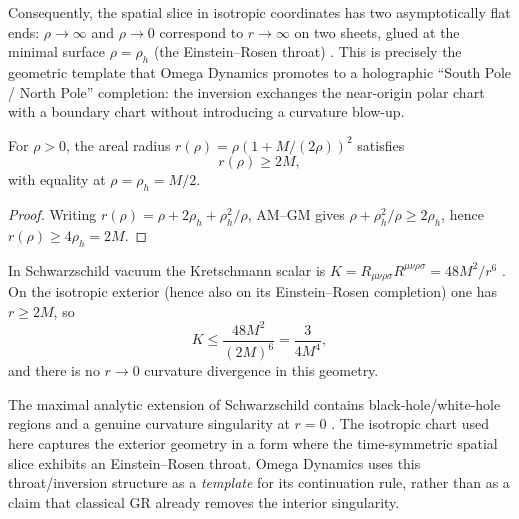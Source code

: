 Consequently, the spatial slice in isotropic coordinates has two asymptotically flat ends: $\rho\to\infty$ and $\rho\to 0$ correspond to $r\to\infty$ on two sheets, glued at the minimal surface $\rho=\rho_h$ (the Einstein--Rosen throat) \cite{EinsteinRosen1935, Kruskal1960}. This is precisely the geometric template that Omega Dynamics promotes to a holographic ``South Pole / North Pole'' completion: the inversion exchanges the near-origin polar chart with a boundary chart without introducing a curvature blow-up.

\begin{proposition}
For $\rho>0$, the areal radius $r(\rho)=\rho(1+M/(2\rho))^2$ satisfies
\begin{equation}
  r(\rho)\ge 2M,
\end{equation}
with equality at $\rho=\rho_h=M/2$.
\end{proposition}
\begin{proof}
Writing $r(\rho)=\rho+2\rho_h+\rho_h^2/\rho$, AM--GM gives $\rho+\rho_h^2/\rho\ge 2\rho_h$, hence $r(\rho)\ge 4\rho_h=2M$.
\end{proof}

\begin{corollary}
In Schwarzschild vacuum the Kretschmann scalar is $K=R_{\mu\nu\rho\sigma}R^{\mu\nu\rho\sigma}=48 M^2/r^6$ \cite{MisnerThorneWheeler1973}. On the isotropic exterior (hence also on its Einstein--Rosen completion) one has $r\ge 2M$, so
\begin{equation}
  K \le \frac{48M^2}{(2M)^6}=\frac{3}{4M^4},
\end{equation}
and there is no $r\to 0$ curvature divergence in this geometry.
\end{corollary}

\begin{remark}
The maximal analytic extension of Schwarzschild contains black-hole/white-hole regions and a genuine curvature singularity at $r=0$ \cite{Kruskal1960, Wald1984}. The isotropic chart used here captures the exterior geometry in a form where the time-symmetric spatial slice exhibits an Einstein--Rosen throat. Omega Dynamics uses this throat/inversion structure as a \emph{template} for its continuation rule, rather than as a claim that classical GR already removes the interior singularity.
\end{remark}

